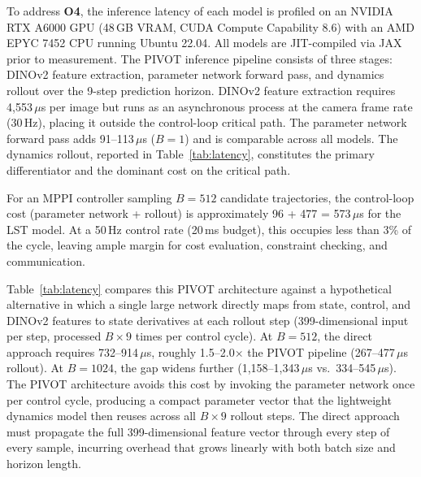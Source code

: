 To address \textbf{O4}, the inference latency of each model is profiled on an NVIDIA RTX A6000 GPU (48\,GB VRAM, CUDA Compute Capability 8.6) with an AMD EPYC 7452 CPU running Ubuntu 22.04. All models are JIT-compiled via JAX prior to measurement. The PIVOT inference pipeline consists of three stages: DINOv2 feature extraction, parameter network forward pass, and dynamics rollout over the 9-step prediction horizon. DINOv2 feature extraction requires 4,553\,$\mu$s per image but runs as an asynchronous process at the camera frame rate (30\,Hz), placing it outside the control-loop critical path. The parameter network forward pass adds 91--113\,$\mu$s ($B = 1$) and is comparable across all models. The dynamics rollout, reported in Table~\ref{tab:latency}, constitutes the primary differentiator and the dominant cost on the critical path.

For an MPPI controller sampling $B = 512$ candidate trajectories, the control-loop cost (parameter network + rollout) is approximately 96 + 477 = 573\,$\mu$s for the LST model. At a 50\,Hz control rate (20\,ms budget), this occupies less than 3\% of the cycle, leaving ample margin for cost evaluation, constraint checking, and communication.

Table~\ref{tab:latency} compares this PIVOT architecture against a hypothetical alternative in which a single large network directly maps from state, control, and DINOv2 features to state derivatives at each rollout step (399-dimensional input per step, processed $B \times 9$ times per control cycle). At $B = 512$, the direct approach requires 732--914\,$\mu$s, roughly 1.5--2.0$\times$ the PIVOT pipeline (267--477\,$\mu$s rollout). At $B = 1024$, the gap widens further (1,158--1,343\,$\mu$s vs.\ 334--545\,$\mu$s). The PIVOT architecture avoids this cost by invoking the parameter network once per control cycle, producing a compact parameter vector that the lightweight dynamics model then reuses across all $B \times 9$ rollout steps. The direct approach must propagate the full 399-dimensional feature vector through every step of every sample, incurring overhead that grows linearly with both batch size and horizon length.

